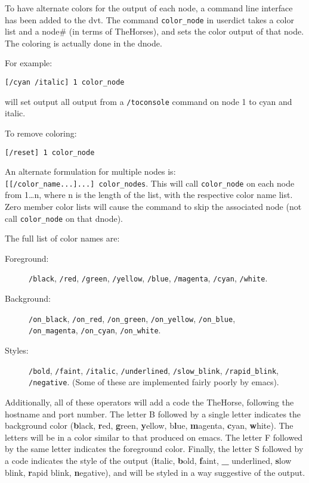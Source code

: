 \documentclass[12pt]{article}
\begin{document}
To have alternate colors for the output of each node, a command line
interface has been added to the dvt. The command \verb$color_node$ in
userdict takes a color list and a node\# (in terms of TheHorses), and
sets the color output of that node. The coloring is actually done in
the dnode.

{For example:\samepage
\begin{verbatim}
[/cyan /italic] 1 color_node
\end{verbatim}
  will set output all output from a \verb$/toconsole$ command on node 1
  to cyan and italic.}

{To remove coloring:\samepage
\begin{verbatim}
[/reset] 1 color_node
\end{verbatim}}
  
An alternate formulation for multiple nodes is: \\
\verb$[[/color_name...]...] color_nodes$.  This will call
\verb$color_node$ on each node from 1\dots n, where n is the length
of the list, with the respective color name list. Zero member color
lists will cause the command to skip the associated node (not call
\verb$color_node$ on that dnode).

The full list of color names are: 
\begin{description}
  \item[Foreground:] \verb$/black$, \verb$/red$, \verb$/green$,
  \verb$/yellow$, \verb$/blue$, \verb$/magenta$, \verb$/cyan$,
  \verb$/white$.
  \item[Background:] \verb$/on_black$, \verb$/on_red$,
  \verb$/on_green$, \verb$/on_yellow$, \verb$/on_blue$, \\
  \verb$/on_magenta$, \verb$/on_cyan$, \verb$/on_white$.
  \item[Styles:] \verb$/bold$, \verb$/faint$, \verb$/italic$,
  \verb$/underlined$, \verb$/slow_blink$, \verb$/rapid_blink$,
  \verb$/negative$. (Some of these are implemented fairly poorly by
  emacs).
\end{description}

Additionally, all of these operators will add a code the TheHorse,
following the hostname and port number. The letter B followed by a
single letter indicates the background color (\textbf{b}lack,
\textbf{r}ed, \textbf{g}reen, \textbf{y}ellow, b\textbf{l}ue,
\textbf{m}agenta, \textbf{c}yan, \textbf{w}hite). The letters will be
in a color similar to that produced on emacs. The letter F followed by
the same letter indicates the foreground color. Finally, the letter S
followed by a code indicates the style of the output (\textbf{i}talic,
\textbf{b}old, \textbf{f}aint, \textbf{\_} underlined, \textbf{s}low
blink, \textbf{r}apid blink, \textbf{n}egative), and will be styled in
a way suggestive of the output.
\end{document}
